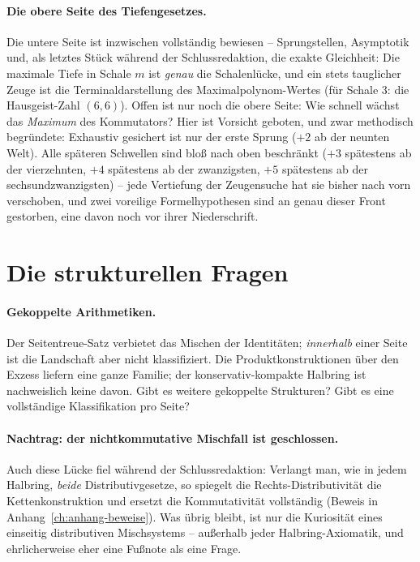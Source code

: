 \paragraph{Die obere Seite des Tiefengesetzes.} Die untere Seite
ist inzwischen vollständig bewiesen -- Sprungstellen, Asymptotik
und, als letztes Stück während der Schlussredaktion, die exakte
Gleichheit: Die maximale Tiefe in Schale $m$ ist \emph{genau} die
Schalenlücke, und ein stets tauglicher Zeuge ist die
Terminaldarstellung des Maximalpolynom-Wertes (für Schale 3: die
Hausgeist-Zahl $(6,6)$).
Offen ist nur noch die obere Seite: Wie schnell wächst das
\emph{Maximum} des Kommutators? Hier ist Vorsicht geboten, und zwar
methodisch begründete: Exhaustiv gesichert ist nur der erste Sprung
($+2$ ab der neunten Welt). Alle späteren Schwellen sind bloß nach
oben beschränkt ($+3$ spätestens ab der vierzehnten, $+4$ spätestens
ab der zwanzigsten, $+5$ spätestens ab der sechsundzwanzigsten) --
jede Vertiefung der Zeugensuche hat sie bisher nach vorn verschoben,
und zwei voreilige Formelhypothesen sind an genau dieser Front
gestorben, eine davon noch vor ihrer Niederschrift.

\section{Die strukturellen Fragen}

\paragraph{Gekoppelte Arithmetiken.} Der Seitentreue-Satz verbietet
das Mischen der Identitäten; \emph{innerhalb} einer Seite ist die
Landschaft aber nicht klassifiziert. Die Produktkonstruktionen über
den Exzess liefern eine ganze Familie; der konservativ-kompakte
Halbring ist nachweislich keine davon. Gibt es weitere gekoppelte
Strukturen? Gibt es eine vollständige Klassifikation pro Seite?

\paragraph{Nachtrag: der nichtkommutative Mischfall ist geschlossen.}
Auch diese Lücke fiel während der Schlussredaktion: Verlangt man,
wie in jedem Halbring, \emph{beide} Distributivgesetze, so spiegelt
die Rechts-Distributivität die Kettenkonstruktion und ersetzt die
Kommutativität vollständig (Beweis in
Anhang~\ref{ch:anhang-beweise}). Was übrig bleibt, ist nur die
Kuriosität eines einseitig distributiven Mischsystems -- außerhalb
jeder Halbring-Axiomatik, und ehrlicherweise eher eine Fußnote als
eine Frage.

